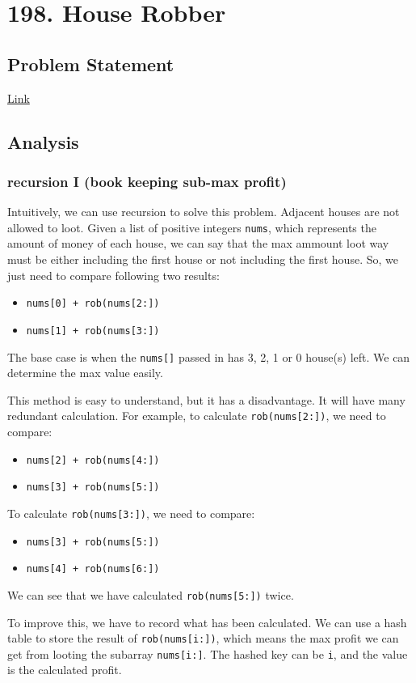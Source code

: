 \documentclass[12pt]{article}
\begin{document}
\section{198. House Robber}
\label{sec:orgd3bf376}
\subsection{Problem Statement}
\label{sec:org19d5344}
\href{https://leetcode.com/problems/house-robber/}{Link}
\subsection{Analysis}
\label{sec:orgb4f7acc}
\subsubsection{recursion I (book keeping sub-max profit)}
\label{sec:org623ce09}
Intuitively, we can use recursion to solve this problem. Adjacent houses are not allowed to loot. Given a list of positive integers \texttt{nums}, which represents the amount of money of each house, we can say that the max ammount loot way must be either including the first house or not including the first house. So, we just need to compare following two results:
\begin{itemize}
\item \texttt{nums[0] + rob(nums[2:])}
\item \texttt{nums[1] + rob(nums[3:])}
\end{itemize}
The base case is when the \texttt{nums[]} passed in has 3, 2, 1 or 0 house(s) left. We can determine the max value easily.

This method is easy to understand, but it has a disadvantage. It will have many redundant calculation. For example, to calculate \texttt{rob(nums[2:])}, we need to compare:
\begin{itemize}
\item \texttt{nums[2] + rob(nums[4:])}
\item \texttt{nums[3] + rob(nums[5:])}
\end{itemize}
To calculate \texttt{rob(nums[3:])}, we need to compare:
\begin{itemize}
\item \texttt{nums[3] + rob(nums[5:])}
\item \texttt{nums[4] + rob(nums[6:])}
\end{itemize}
We can see that we have calculated \texttt{rob(nums[5:])} twice.

To improve this, we have to record what has been calculated. We can use a hash table to store the result of \texttt{rob(nums[i:])}, which means the max profit we can get from looting the subarray \texttt{nums[i:]}. The hashed key can be \texttt{i}, and the value is the calculated profit.
\end{document}
